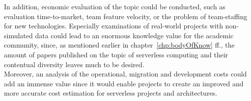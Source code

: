 In addition, economic evaluation of the topic could be conducted, such as evaluation time-to-market, team feature velocity, or the problem of team-staffing for new technologies. Especially examinations of real-world projects with non-simulated data could lead to an enormous knowledge value for the academic community, since, as mentioned earlier in chapter~\vref{chp:bodyOfKnow} ff., the amount of papers published on the topic of serverless computing and their contentual diversity leaves much to be desired. \\
Moreover, an analysis of the operational, migration and development costs could add an immense value since it would enable projects to create an improved and more accurate cost estimation for serverless projects and architectures. 


